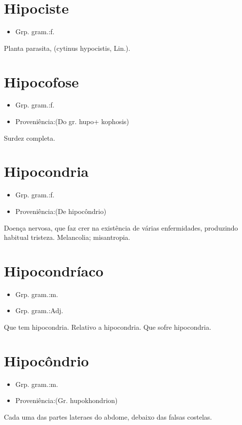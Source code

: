 \documentclass{article}
\begin{document}
\section{Hipociste}
\begin{itemize}
\item {Grp. gram.:f.}
\end{itemize}
Planta parasita, (\textunderscore cytinus hypocistis\textunderscore , Lin.).
\section{Hipocofose}
\begin{itemize}
\item {Grp. gram.:f.}
\end{itemize}
\begin{itemize}
\item {Proveniência:(Do gr. \textunderscore hupo\textunderscore  + \textunderscore kophosis\textunderscore )}
\end{itemize}
Surdez completa.
\section{Hipocondria}
\begin{itemize}
\item {Grp. gram.:f.}
\end{itemize}
\begin{itemize}
\item {Proveniência:(De \textunderscore hipocôndrio\textunderscore )}
\end{itemize}
Doença nervosa, que faz crer na existência de várias enfermidades, produzindo habitual tristeza.
Melancolia; misantropia.
\section{Hipocondríaco}
\begin{itemize}
\item {Grp. gram.:m.}
\end{itemize}
\begin{itemize}
\item {Grp. gram.:Adj.}
\end{itemize}
Que tem hipocondria.
Relativo a hipocondria.
Que sofre hipocondria.
\section{Hipocôndrio}
\begin{itemize}
\item {Grp. gram.:m.}
\end{itemize}
\begin{itemize}
\item {Proveniência:(Gr. \textunderscore hupokhondrion\textunderscore )}
\end{itemize}
Cada uma das partes lateraes do abdome, debaixo das falsas costelas.
\end{document}
